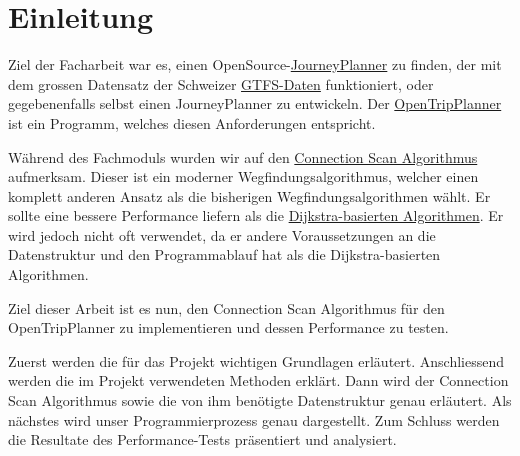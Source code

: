 \section{Einleitung}

Ziel der Facharbeit war es, einen OpenSource-\hyperlink{JourneyPlanner}{JourneyPlanner} zu finden, der mit dem grossen Datensatz der Schweizer \hyperlink{GTFS}{GTFS-Daten} funktioniert, oder gegebenenfalls selbst einen JourneyPlanner zu entwickeln. Der \hyperlink{OTP}{OpenTripPlanner} ist ein Programm, welches diesen Anforderungen entspricht. \newline

Während des Fachmoduls wurden wir auf den \hyperlink{CSA}{Connection Scan Algorithmus} aufmerksam. Dieser ist ein moderner Wegfindungsalgorithmus, welcher einen komplett anderen Ansatz als die bisherigen Wegfindungsalgorithmen wählt. Er sollte eine bessere Performance liefern als die \hyperlink{dij}{Dijkstra-basierten Algorithmen}. Er wird jedoch nicht oft verwendet, da er andere Voraussetzungen an die Datenstruktur und den Programmablauf hat als die Dijkstra-basierten Algorithmen. \newline

Ziel dieser Arbeit ist es nun, den Connection Scan Algorithmus für den OpenTripPlanner zu implementieren und dessen Performance zu testen. \newline

Zuerst werden die für das Projekt wichtigen Grundlagen erläutert. Anschliessend werden die im Projekt verwendeten Methoden erklärt. Dann wird der Connection Scan Algorithmus sowie die von ihm benötigte Datenstruktur genau erläutert. Als nächstes wird unser Programmierprozess genau dargestellt. Zum Schluss werden die Resultate des Performance-Tests präsentiert und analysiert.